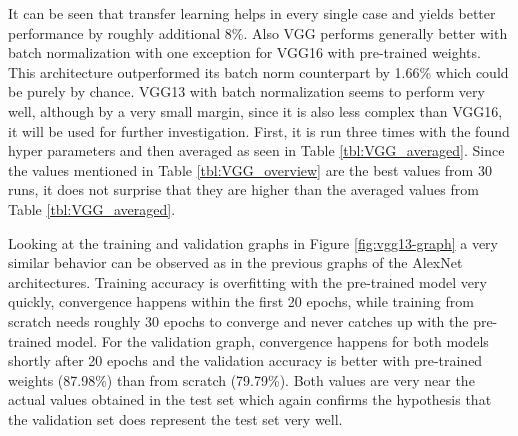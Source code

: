It can be seen that transfer learning helps in every single case and yields better performance by roughly additional 8\%. Also VGG performs generally better with batch normalization with one exception for VGG16 with pre-trained weights. This architecture outperformed its batch norm counterpart by 1.66\% which could be purely by chance. VGG13 with batch normalization seems to perform very well, although by a very small margin, since it is also less complex than VGG16, it will be used for further investigation. First, it is run three times with the found hyper parameters and then averaged as seen in Table \ref{tbl:VGG_averaged}. Since the values mentioned in Table \ref{tbl:VGG_overview} are the best values from 30 runs, it does not surprise that they are higher than the averaged values from Table \ref{tbl:VGG_averaged}. \\


\begin{table}[!h] \centering
{}
\caption{Running the best VGG architecture three times with the found hyperparameters and averaging across the total of runs. }
\label{tbl:VGG_averaged}
\end{table}

Looking at the training and validation graphs in Figure \ref{fig:vgg13-graph} a very similar behavior can be observed as in the previous graphs of the AlexNet architectures. Training accuracy is overfitting with the pre-trained model very quickly, convergence happens within the first 20 epochs, while training from scratch needs roughly 30 epochs to converge and never catches up with the pre-trained model. For the validation graph, convergence happens for both models shortly after 20 epochs and the validation accuracy is better with pre-trained weights (87.98\%) than from scratch (79.79\%). Both values are very near the actual values obtained in the test set which again confirms the hypothesis that the validation set does represent the test set very well. \\


